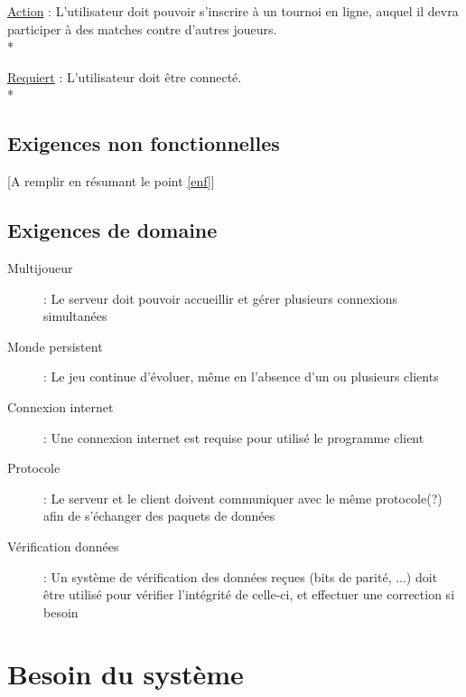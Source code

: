 \documentclass[a4paper]{article}
\begin{document}
\begin{description}[style=nextline]
			\item[Tournois :]
			\begin{description}[leftmargin=*] %
				\item[]
				\item \underline{Action} : L'utilisateur doit pouvoir s'inscrire à un tournoi en ligne, auquel il devra participer à des matches contre d'autres joueurs.\\*
				\item \underline{Requiert} : L'utilisateur doit être connecté.\\*
			\end{description} %
			
		\end{description}

\subsection{Exigences non fonctionnelles}
[A remplir en résumant le point \ref{enf}]

\subsection{Exigences de domaine}
\begin{description}
\item[Multijoueur] : Le serveur doit pouvoir accueillir et gérer plusieurs connexions simultanées
\item[Monde persistent] : Le jeu continue d'évoluer, même en l'absence d'un ou plusieurs clients
\item[Connexion internet] : Une connexion internet est requise pour utilisé le programme client
\item[Protocole] : Le serveur et le client doivent communiquer avec le même protocole(?) afin de s'échanger des paquets de données
\item[Vérification données] : Un système de vérification des données reçues (bits de parité, ...) doit être utilisé pour vérifier l'intégrité de celle-ci, et effectuer une correction si besoin
\end{description}

\section{Besoin du système}
\end{document}
